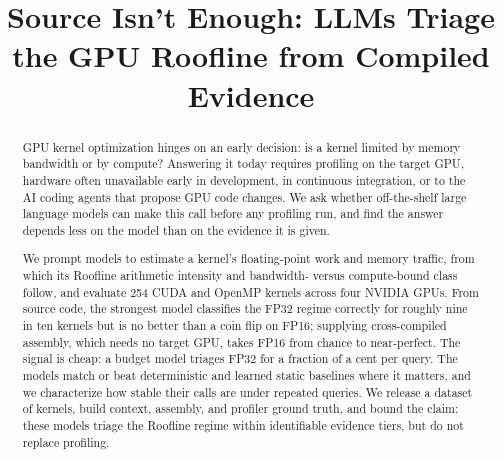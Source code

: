 \documentclass[10pt,conference]{IEEEtran}
\begin{document}
\title{Source Isn't Enough: LLMs Triage the GPU Roofline from Compiled Evidence}

\author{
}

\maketitle


\begin{abstract}
GPU kernel optimization hinges on an early decision: is a kernel limited by memory bandwidth or by compute?
Answering it today requires profiling on the target GPU, hardware often unavailable early in development, in continuous integration, or to the AI coding agents that propose GPU code changes.
We ask whether off-the-shelf large language models can make this call before any profiling run, and find the answer depends less on the model than on the evidence it is given.

We prompt models to estimate a kernel's floating-point work and memory traffic, from which its Roofline arithmetic intensity and bandwidth- versus compute-bound class follow, and evaluate 254 CUDA and OpenMP kernels across four NVIDIA GPUs.
From source code, the strongest model classifies the FP32 regime correctly for roughly nine in ten kernels but is no better than a coin flip on FP16; supplying cross-compiled assembly, which needs no target GPU, takes FP16 from chance to near-perfect.
The signal is cheap: a budget model triages FP32 for a fraction of a cent per query.
The models match or beat deterministic and learned static baselines where it matters, and we characterize how stable their calls are under repeated queries.
We release a dataset of kernels, build context, assembly, and profiler ground truth, and bound the claim: these models triage the Roofline regime within identifiable evidence tiers, but do not replace profiling.
\end{abstract}
\end{document}
